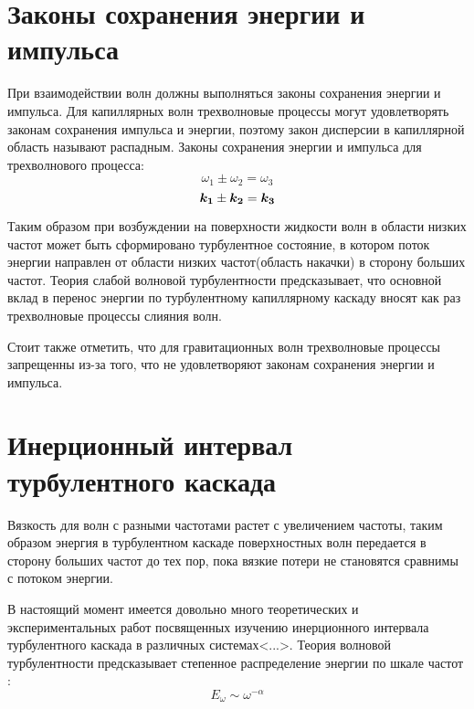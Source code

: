 \section{Законы сохранения энергии и импульса} %

При взаимодействии волн должны выполняться законы сохранения энергии и импульса. Для капиллярных волн трехволновые процессы могут удовлетворять законам сохранения импульса и энергии, поэтому закон дисперсии в капиллярной область называют распадным. Законы сохранения энергии и импульса для трехволнового процесса:
\begin{equation}
 \label{eq:saveOmega}
\omega_1 \pm \omega_2 = \omega_3
\end{equation}
\begin{equation}
 \label{eq:saveK}
\mbox{\boldmath$k_1$} \pm \mbox{\boldmath$k_2$} = \mbox{\boldmath$k_3$}
\end{equation}

Таким образом при возбуждении на поверхности жидкости волн в области низких частот может быть сформировано турбулентное состояние, в котором поток энергии направлен от области низких частот(область накачки) в сторону больших частот. Теория слабой волновой турбулентности \cite{Zakharov} предсказывает, что основной вклад в перенос энергии по турбулентному капиллярному каскаду вносят как раз трехволновые процессы слияния волн. 

Стоит также отметить, что для гравитационных волн трехволновые процессы запрещенны из-за того, что не удовлетворяют законам сохранения энергии и импульса.


\section{Инерционный интервал турбулентного каскада}%

Вязкость для волн с разными частотами растет с увеличением частоты, таким образом энергия в турбулентном каскаде поверхностных волн передается в сторону больших частот до тех пор, пока вязкие потери не становятся сравнимы с потоком энергии.

В настоящий момент имеется довольно много теоретических и экспериментальных работ посвященных изучению инерционного интервала турбулентного каскада в различных системах<...>. Теория волновой турбулентности предсказывает степенное распределение энергии по шкале частот \cite{Zakharov}:
\begin{equation}
\label{eq:EOmega}
E_\omega \sim \omega^{-\alpha}
\end{equation}

